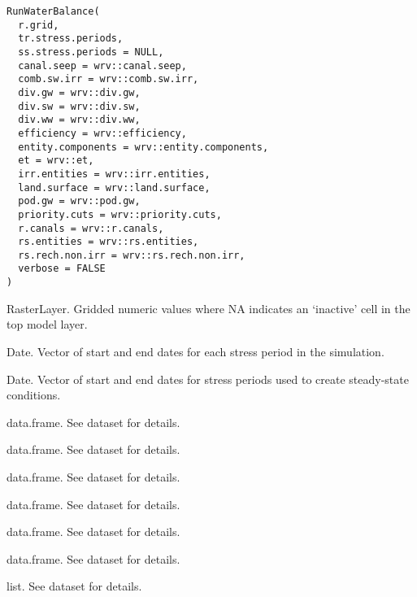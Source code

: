 \documentclass[a4paper]{book}
\begin{document}
%
\begin{Usage}
\begin{verbatim}
RunWaterBalance(
  r.grid,
  tr.stress.periods,
  ss.stress.periods = NULL,
  canal.seep = wrv::canal.seep,
  comb.sw.irr = wrv::comb.sw.irr,
  div.gw = wrv::div.gw,
  div.sw = wrv::div.sw,
  div.ww = wrv::div.ww,
  efficiency = wrv::efficiency,
  entity.components = wrv::entity.components,
  et = wrv::et,
  irr.entities = wrv::irr.entities,
  land.surface = wrv::land.surface,
  pod.gw = wrv::pod.gw,
  priority.cuts = wrv::priority.cuts,
  r.canals = wrv::r.canals,
  rs.entities = wrv::rs.entities,
  rs.rech.non.irr = wrv::rs.rech.non.irr,
  verbose = FALSE
)
\end{verbatim}
\end{Usage}
%
\begin{Arguments}
\begin{ldescription}
\item[\code{r.grid}] RasterLayer.
Gridded numeric values where NA indicates an `inactive' cell in
the top model layer.

\item[\code{tr.stress.periods}] Date.
Vector of start and end dates for each stress period in the simulation.

\item[\code{ss.stress.periods}] Date.
Vector of start and end dates for stress periods used to create steady-state conditions.

\item[\code{canal.seep}] data.frame.
See  dataset for details.

\item[\code{comb.sw.irr}] data.frame.
See  dataset for details.

\item[\code{div.gw}] data.frame.
See  dataset for details.

\item[\code{div.sw}] data.frame.
See  dataset for details.

\item[\code{div.ww}] data.frame.
See  dataset for details.

\item[\code{efficiency}] data.frame.
See  dataset for details.

\item[\code{entity.components}] list.
See  dataset for details.


\end{ldescription}
\end{Arguments}
\end{document}
